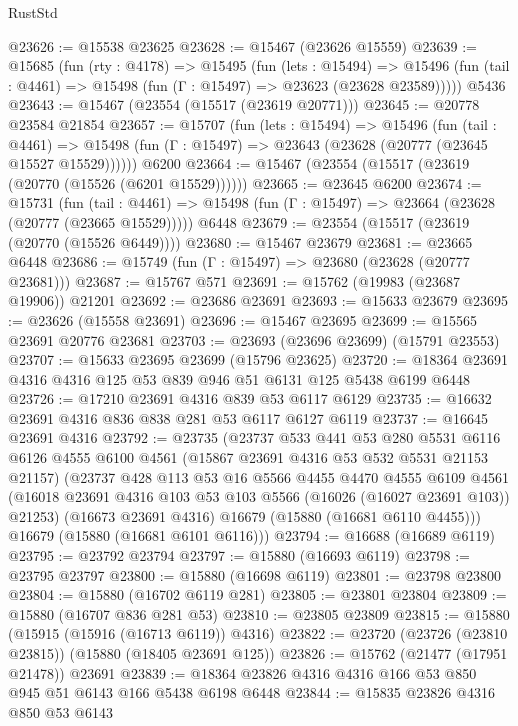 \begin{lexlean}{RustStd}
\begin{coremodule}
@23626 := @15538 @23625
@23628 := @15467 (@23626 @15559)
@23639 := @15685
    (fun (rty : @4178) =>
    @15495
      (fun (lets : @15494) =>
      @15496 (fun (tail : @4461) => @15498 (fun (Γ : @15497) => @23623 (@23628 @23589)))))
    @5436
@23643 := @15467 (@23554 (@15517 (@23619 @20771)))
@23645 := @20778 @23584 @21854
@23657 := @15707
    (fun (lets : @15494) =>
    @15496
      (fun (tail : @4461) =>
      @15498 (fun (Γ : @15497) => @23643 (@23628 (@20777 (@23645 @15527 @15529))))))
    @6200
@23664 := @15467 (@23554 (@15517 (@23619 (@20770 (@15526 (@6201 @15529))))))
@23665 := @23645 @6200
@23674 := @15731
    (fun (tail : @4461) => @15498 (fun (Γ : @15497) => @23664 (@23628 (@20777 (@23665 @15529)))))
    @6448
@23679 := @23554 (@15517 (@23619 (@20770 (@15526 @6449))))
@23680 := @15467 @23679
@23681 := @23665 @6448
@23686 := @15749 (fun (Γ : @15497) => @23680 (@23628 (@20777 @23681)))
@23687 := @15767 @571
@23691 := @15762 (@19983 (@23687 @19906)) @21201
@23692 := @23686 @23691
@23693 := @15633 @23679
@23695 := @23626 (@15558 @23691)
@23696 := @15467 @23695
@23699 := @15565 @23691 @20776 @23681
@23703 := @23693 (@23696 @23699) (@15791 @23553)
@23707 := @15633 @23695 @23699 (@15796 @23625)
@23720 := @18364 @23691 @4316 @4316 @125 @53 @839 @946 @51 @6131 @125 @5438 @6199 @6448
@23726 := @17210 @23691 @4316 @839 @53 @6117 @6129
@23735 := @16632 @23691 @4316 @836 @838 @281 @53 @6117 @6127 @6119
@23737 := @16645 @23691 @4316
@23792 := @23735
    (@23737
      @533
      @441
      @53
      @280
      @5531
      @6116
      @6126
      @4555
      @6100
      @4561
      (@15867 @23691 @4316 @53 @532 @5531 @21153 @21157)
      (@23737
        @428
        @113
        @53
        @16
        @5566
        @4455
        @4470
        @4555
        @6109
        @4561
        (@16018 @23691 @4316 @103 @53 @103 @5566 (@16026 (@16027 @23691 @103)) @21253)
        (@16673 @23691 @4316)
        @16679
        (@15880 (@16681 @6110 @4455)))
      @16679
      (@15880 (@16681 @6101 @6116)))
@23794 := @16688 (@16689 @6119)
@23795 := @23792 @23794
@23797 := @15880 (@16693 @6119)
@23798 := @23795 @23797
@23800 := @15880 (@16698 @6119)
@23801 := @23798 @23800
@23804 := @15880 (@16702 @6119 @281)
@23805 := @23801 @23804
@23809 := @15880 (@16707 @836 @281 @53)
@23810 := @23805 @23809
@23815 := @15880 (@15915 (@15916 (@16713 @6119)) @4316)
@23822 := @23720 (@23726 (@23810 @23815)) (@15880 (@18405 @23691 @125))
@23826 := @15762 (@21477 (@17951 @21478)) @23691
@23839 := @18364 @23826 @4316 @4316 @166 @53 @850 @945 @51 @6143 @166 @5438 @6198 @6448
@23844 := @15835 @23826 @4316 @850 @53 @6143

\end{coremodule}
\end{lexlean}
